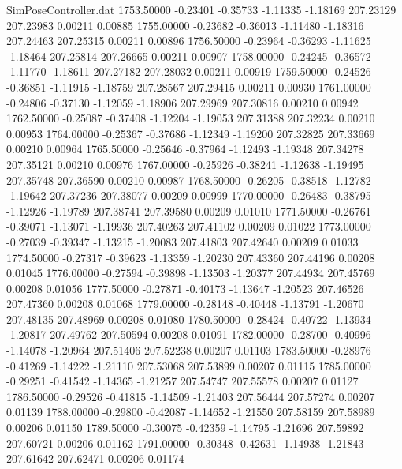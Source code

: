 \begin{filecontents}{SimPoseController.dat}
1753.50000   -0.23401   -0.35733    -1.11335   -1.18169  207.23129  207.23983    0.00211    0.00885
1755.00000   -0.23682   -0.36013    -1.11480   -1.18316  207.24463  207.25315    0.00211    0.00896
1756.50000   -0.23964   -0.36293    -1.11625   -1.18464  207.25814  207.26665    0.00211    0.00907
1758.00000   -0.24245   -0.36572    -1.11770   -1.18611  207.27182  207.28032    0.00211    0.00919
1759.50000   -0.24526   -0.36851    -1.11915   -1.18759  207.28567  207.29415    0.00211    0.00930
1761.00000   -0.24806   -0.37130    -1.12059   -1.18906  207.29969  207.30816    0.00210    0.00942
1762.50000   -0.25087   -0.37408    -1.12204   -1.19053  207.31388  207.32234    0.00210    0.00953
1764.00000   -0.25367   -0.37686    -1.12349   -1.19200  207.32825  207.33669    0.00210    0.00964
1765.50000   -0.25646   -0.37964    -1.12493   -1.19348  207.34278  207.35121    0.00210    0.00976
1767.00000   -0.25926   -0.38241    -1.12638   -1.19495  207.35748  207.36590    0.00210    0.00987
1768.50000   -0.26205   -0.38518    -1.12782   -1.19642  207.37236  207.38077    0.00209    0.00999
1770.00000   -0.26483   -0.38795    -1.12926   -1.19789  207.38741  207.39580    0.00209    0.01010
1771.50000   -0.26761   -0.39071    -1.13071   -1.19936  207.40263  207.41102    0.00209    0.01022
1773.00000   -0.27039   -0.39347    -1.13215   -1.20083  207.41803  207.42640    0.00209    0.01033
1774.50000   -0.27317   -0.39623    -1.13359   -1.20230  207.43360  207.44196    0.00208    0.01045
1776.00000   -0.27594   -0.39898    -1.13503   -1.20377  207.44934  207.45769    0.00208    0.01056
1777.50000   -0.27871   -0.40173    -1.13647   -1.20523  207.46526  207.47360    0.00208    0.01068
1779.00000   -0.28148   -0.40448    -1.13791   -1.20670  207.48135  207.48969    0.00208    0.01080
1780.50000   -0.28424   -0.40722    -1.13934   -1.20817  207.49762  207.50594    0.00208    0.01091
1782.00000   -0.28700   -0.40996    -1.14078   -1.20964  207.51406  207.52238    0.00207    0.01103
1783.50000   -0.28976   -0.41269    -1.14222   -1.21110  207.53068  207.53899    0.00207    0.01115
1785.00000   -0.29251   -0.41542    -1.14365   -1.21257  207.54747  207.55578    0.00207    0.01127
1786.50000   -0.29526   -0.41815    -1.14509   -1.21403  207.56444  207.57274    0.00207    0.01139
1788.00000   -0.29800   -0.42087    -1.14652   -1.21550  207.58159  207.58989    0.00206    0.01150
1789.50000   -0.30075   -0.42359    -1.14795   -1.21696  207.59892  207.60721    0.00206    0.01162
1791.00000   -0.30348   -0.42631    -1.14938   -1.21843  207.61642  207.62471    0.00206    0.01174

\end{filecontents}
